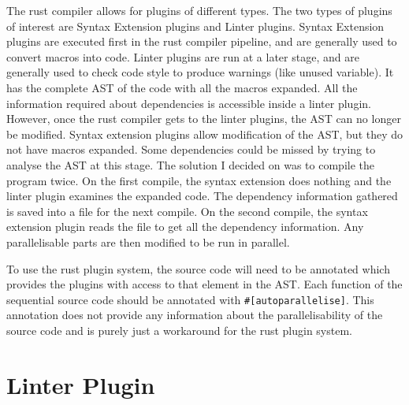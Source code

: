 The rust compiler allows for plugins of different types. The two types of plugins of interest are Syntax Extension plugins and Linter plugins. Syntax Extension plugins are executed first in the rust compiler pipeline, and are generally used to convert macros into code. Linter plugins are run at a later stage, and are generally used to check code style to produce warnings (like unused variable). It has the complete AST of the code with all the macros expanded. All the information required about dependencies is accessible inside a linter plugin. However, once the rust compiler gets to the linter plugins, the AST can no longer be modified. Syntax extension plugins allow modification of the AST, but they do not have macros expanded. Some dependencies could be missed by trying to analyse the AST at this stage. The solution I decided on was to compile the program twice. On the first compile, the syntax extension does nothing and the linter plugin examines the expanded code. The dependency information gathered is saved into a file for the next compile. On the second compile, the syntax extension plugin reads the file to get all the dependency information. Any parallelisable parts are then modified to be run in parallel.

To use the rust plugin system, the source code will need to be annotated which provides the plugins with access to that element in the AST. Each function of the sequential source code should be annotated with \texttt{\#[autoparallelise]}. This annotation does not provide any information about the parallelisability of the source code and is purely just a workaround for the rust plugin system.

\section{Linter Plugin}


